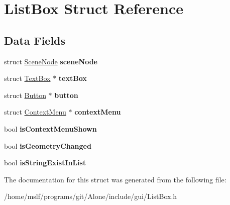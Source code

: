 \hypertarget{struct_list_box}{}\section{List\+Box Struct Reference}
\label{struct_list_box}
\subsection*{Data Fields}
\begin{DoxyCompactItemize}
\item 
\hypertarget{struct_list_box_aca8025f56fb4ce20b974ec9a3292a9e4}{}\label{struct_list_box_aca8025f56fb4ce20b974ec9a3292a9e4} 
struct \hyperlink{struct_scene_node}{Scene\+Node} {\bfseries scene\+Node}
\item 
\hypertarget{struct_list_box_a4c2396262291ca9d80db5fcab602e824}{}\label{struct_list_box_a4c2396262291ca9d80db5fcab602e824} 
struct \hyperlink{struct_text_box}{Text\+Box} $\ast$ {\bfseries text\+Box}
\item 
\hypertarget{struct_list_box_ae7aee5d2fea3fa9c160fcb9341275053}{}\label{struct_list_box_ae7aee5d2fea3fa9c160fcb9341275053} 
struct \hyperlink{struct_button}{Button} $\ast$ {\bfseries button}
\item 
\hypertarget{struct_list_box_a5b4d2d19ff75508aa4f61e4c42a42e3c}{}\label{struct_list_box_a5b4d2d19ff75508aa4f61e4c42a42e3c} 
struct \hyperlink{struct_context_menu}{Context\+Menu} $\ast$ {\bfseries context\+Menu}
\item 
\hypertarget{struct_list_box_a06e83cefd5236408ec725d6dd353ec63}{}\label{struct_list_box_a06e83cefd5236408ec725d6dd353ec63} 
bool {\bfseries is\+Context\+Menu\+Shown}
\item 
\hypertarget{struct_list_box_a8ea7e8ac3e3330830aa7a4309390f3ac}{}\label{struct_list_box_a8ea7e8ac3e3330830aa7a4309390f3ac} 
bool {\bfseries is\+Geometry\+Changed}
\item 
\hypertarget{struct_list_box_a284c5592089954400f6ea24229c31617}{}\label{struct_list_box_a284c5592089954400f6ea24229c31617} 
bool {\bfseries is\+String\+Exist\+In\+List}
\end{DoxyCompactItemize}


The documentation for this struct was generated from the following file\+:\begin{DoxyCompactItemize}
\item 
/home/mslf/programs/git/\+Alone/include/gui/List\+Box.\+h\end{DoxyCompactItemize}
